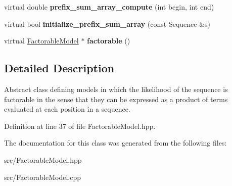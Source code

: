 \begin{DoxyCompactItemize}
\mbox{\label{classtops_1_1FactorableModel_a52a4240058e32f4e6ddf75fdab138a4f}} 
virtual double {\bfseries prefix\+\_\+sum\+\_\+array\+\_\+compute} (int begin, int end)
\item 
\mbox{\label{classtops_1_1FactorableModel_ae3f8aea76a131eb4b64bd8d9704992ca}} 
virtual bool {\bfseries initialize\+\_\+prefix\+\_\+sum\+\_\+array} (const Sequence \&s)
\item 
\mbox{\label{classtops_1_1FactorableModel_afba8e107a95517fac416662c641afe65}} 
virtual \hyperlink{classtops_1_1FactorableModel}{Factorable\+Model} $\ast$ {\bfseries factorable} ()
\end{DoxyCompactItemize}


\subsection{Detailed Description}
Abstract class defining models in which the likelihood of the sequence is factorable in the sense that they can be expressed as a product of terms evaluated at each position in a sequence. 

Definition at line 37 of file Factorable\+Model.\+hpp.



The documentation for this class was generated from the following files\+:\begin{DoxyCompactItemize}
\item 
src/Factorable\+Model.\+hpp\item 
src/Factorable\+Model.\+cpp\end{DoxyCompactItemize}
